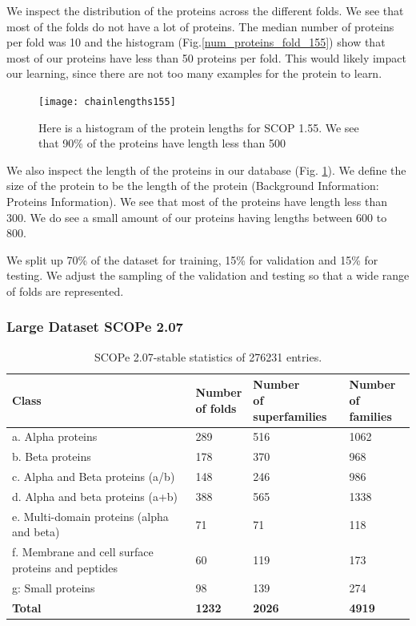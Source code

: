 \documentclass[12pt, a4paper, twocolumn, fullpage]{article}
\theoremstyle{plain}
\theoremstyle{definition}
\theoremstyle{remark}
\begin{document}
We inspect the distribution of the proteins across the different folds. We see that most of the folds do not have a lot of proteins. The median number of proteins per fold was 10 and the histogram (Fig.\ref{num_proteins_fold_155}) show that most of our proteins have less than 50 proteins per fold. This would likely impact our learning, since there are not too many examples for the protein to learn.


\begin{figure}
    \texttt{[image: chainlengths155]}
    \caption{Here is a histogram of the protein lengths for SCOP 1.55. We see that 90\% of the proteins have length less than 500}
    \label{chainlengths155}
\end{figure}

We also inspect the length of the proteins in our database (Fig. \ref{chainlengths155}). We define the size of the protein to be the length of the protein (Background Information: Proteins Information). We see that most of the proteins have length less than 300. We do see a small amount of our proteins having lengths between 600 to 800. 

We split up 70\% of the dataset for training, 15\% for validation and 15\% for testing. We adjust the sampling of the validation and testing so that a wide range of folds are represented.

\subsubsection{Large Dataset SCOPe 2.07}

\begin{table}[h]
    \centering
    \begin{tabular}{| l | l | l | l |}
        \hline 
        Class & \makecell{Number \\ of folds} & \makecell{Number  \\ of superfamilies} & \makecell{Number \\ of families} \\ \hline
        a. Alpha proteins & 289 & 516 & 1062 \\ \hline
        b. Beta proteins & 178 & 370 & 968 \\ \hline
        c. Alpha and Beta proteins (a/b) & 148 & 246 & 986 \\ \hline
        d. Alpha and beta proteins (a+b) & 388 & 565 & 1338 \\ \hline
        e. Multi-domain proteins (alpha and beta) & 71 & 71 & 118 \\ \hline
        \makecell[l]{f. Membrane and cell surface \\ proteins and peptides} & 60 & 119 & 173 \\ \hline
        g: Small proteins & 98 & 139 & 274 \\ \hline
        \textbf{Total} & \textbf{1232} & \textbf{2026} & \textbf{4919}  \\ \hline
        \hline
    \end{tabular}
    \caption{ SCOPe 2.07-stable statistics of 276231 entries. }
    \label{}
\end{table}
\end{document}
